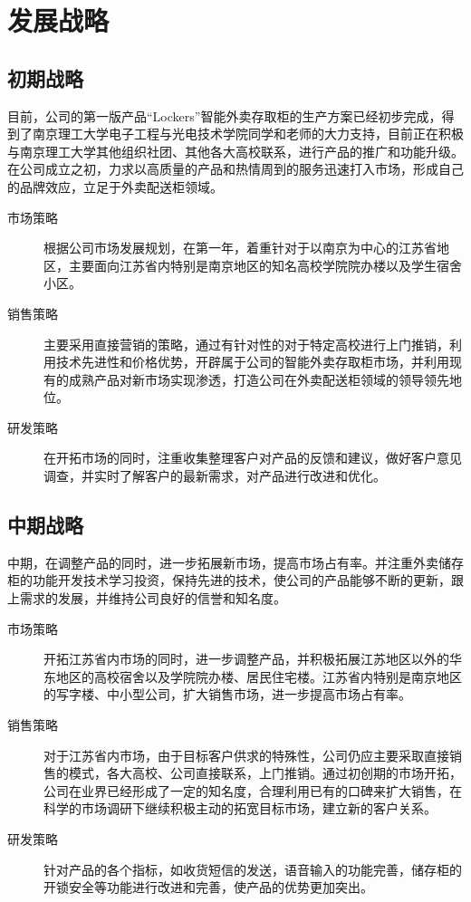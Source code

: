 \documentclass[violet]{main}
\begin{document}
		\section{发展战略}
			\subsection{初期战略}
				目前，公司的第一版产品“Lockers”智能外卖存取柜的生产方案已经初步完成，得到了南京理工大学电子工程与光电技术学院同学和老师的大力支持，目前正在积极与南京理工大学其他组织社团、其他各大高校联系，进行产品的推广和功能升级。在公司成立之初，力求以高质量的产品和热情周到的服务迅速打入市场，形成自己的品牌效应，立足于外卖配送柜领域。
				\begin{description}
					\item[市场策略]根据公司市场发展规划，在第一年，着重针对于以南京为中心的江苏省地区，主要面向江苏省内特别是南京地区的知名高校学院院办楼以及学生宿舍小区。
					\item[销售策略]主要采用直接营销的策略，通过有针对性的对于特定高校进行上门推销，利用技术先进性和价格优势，开辟属于公司的智能外卖存取柜市场，并利用现有的成熟产品对新市场实现渗透，打造公司在外卖配送柜领域的领导领先地位。
					\item[研发策略]在开拓市场的同时，注重收集整理客户对产品的反馈和建议，做好客户意见调查，并实时了解客户的最新需求，对产品进行改进和优化。
				\end{description}
				\subsection{中期战略}
					中期，在调整产品的同时，进一步拓展新市场，提高市场占有率。并注重外卖储存柜的功能开发技术学习投资，保持先进的技术，使公司的产品能够不断的更新，跟上需求的发展，并维持公司良好的信誉和知名度。
				\begin{description}
					\item[市场策略]开拓江苏省内市场的同时，进一步调整产品，并积极拓展江苏地区以外的华东地区的高校宿舍以及学院院办楼、居民住宅楼。江苏省内特别是南京地区的写字楼、中小型公司，扩大销售市场，进一步提高市场占有率。
					\item[销售策略]对于江苏省内市场，由于目标客户供求的特殊性，公司仍应主要采取直接销售的模式，各大高校、公司直接联系，上门推销。通过初创期的市场开拓，公司在业界已经形成了一定的知名度，合理利用已有的口碑来扩大销售，在科学的市场调研下继续积极主动的拓宽目标市场，建立新的客户关系。
					\item[研发策略]针对产品的各个指标，如收货短信的发送，语音输入的功能完善，储存柜的开锁安全等功能进行改进和完善，使产品的优势更加突出。
				\end{description}
\end{document}
